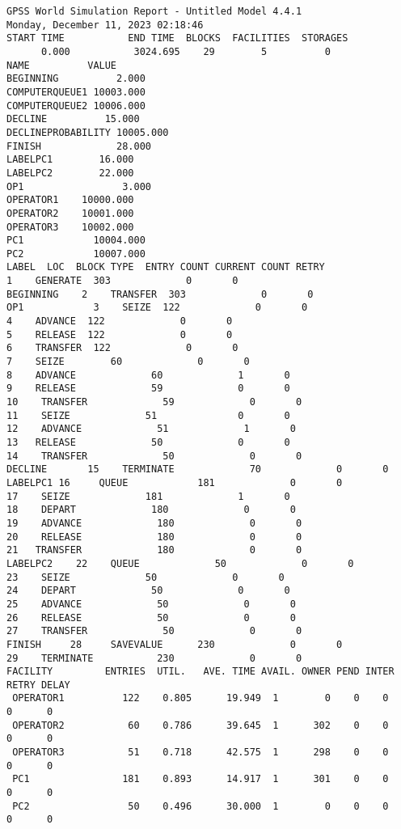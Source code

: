 \begin{lstlisting}[label=lst:1,caption=Результат работы разработанной программы]
GPSS World Simulation Report - Untitled Model 4.4.1
Monday, December 11, 2023 02:18:46  
START TIME           END TIME  BLOCKS  FACILITIES  STORAGES
      0.000           3024.695    29        5          0
NAME          VALUE  
BEGINNING          2.000
COMPUTERQUEUE1 10003.000
COMPUTERQUEUE2 10006.000
DECLINE          15.000
DECLINEPROBABILITY 10005.000
FINISH             28.000
LABELPC1        16.000
LABELPC2        22.000
OP1                 3.000
OPERATOR1    10000.000
OPERATOR2    10001.000
OPERATOR3    10002.000
PC1            10004.000
PC2            10007.000
LABEL  LOC  BLOCK TYPE  ENTRY COUNT CURRENT COUNT RETRY
1    GENERATE  303             0       0
BEGINNING    2    TRANSFER  303             0       0
OP1            3    SEIZE  122             0       0
4    ADVANCE  122             0       0
5    RELEASE  122             0       0
6    TRANSFER  122             0       0
7    SEIZE        60             0       0
8    ADVANCE             60             1       0
9    RELEASE             59             0       0
10    TRANSFER             59             0       0
11    SEIZE             51              0       0
12    ADVANCE             51             1       0
13   RELEASE             50             0       0
14    TRANSFER             50             0       0
DECLINE       15    TERMINATE             70             0       0
LABELPC1 16     QUEUE            181             0       0
17    SEIZE             181             1       0
18    DEPART             180             0       0
19    ADVANCE             180             0       0
20    RELEASE             180             0       0
21   TRANSFER             180             0       0
LABELPC2    22    QUEUE             50             0       0
23    SEIZE             50             0       0
24    DEPART             50             0       0
25    ADVANCE             50             0       0
26    RELEASE             50             0       0
27    TRANSFER             50             0       0
FINISH     28     SAVEVALUE      230             0       0
29    TERMINATE           230             0       0
FACILITY         ENTRIES  UTIL.   AVE. TIME AVAIL. OWNER PEND INTER RETRY DELAY
 OPERATOR1          122    0.805      19.949  1        0    0    0     0      0
 OPERATOR2           60    0.786      39.645  1      302    0    0     0      0
 OPERATOR3           51    0.718      42.575  1      298    0    0     0      0
 PC1                181    0.893      14.917  1      301    0    0     0      0
 PC2                 50    0.496      30.000  1        0    0    0     0      0



\end{lstlisting}
